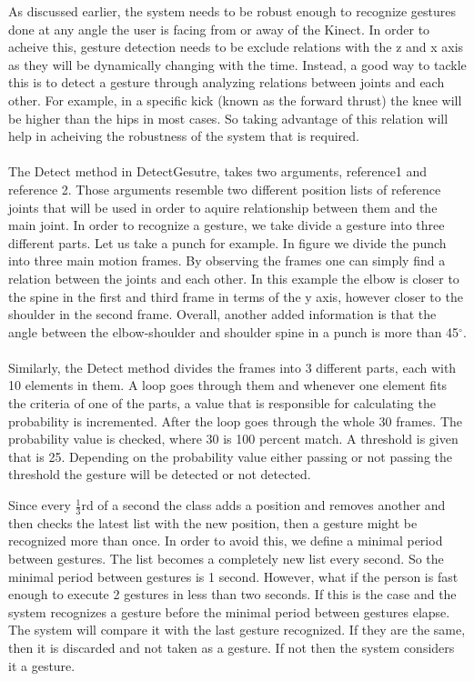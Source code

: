 

As discussed earlier, the system needs to be robust enough to recognize gestures done at any angle the user is facing from or away of the Kinect. In order to acheive this, gesture detection needs to be exclude relations with the z and x axis as they will be dynamically changing with the time. Instead, a good way to tackle this is to detect a gesture through analyzing relations between joints and each other. For example, in a specific kick (known as the forward thrust) the knee will be higher than the hips in most cases. So taking advantage of this relation will help in acheiving the robustness of the system that is required.
\\
\\
The Detect method in DetectGesutre, takes two arguments, reference1 and reference 2. Those arguments resemble two different position lists of reference joints that will be used in order to aquire relationship between them and the main joint. In order to recognize a gesture, we take divide a gesture into three different parts. Let us take a punch for example. In figure %
we divide the punch into three main motion frames. By observing the frames one can simply find a relation between the joints and each other. In this example the elbow is closer to the spine in the first and third frame in terms of the y axis, however closer to the shoulder in the second frame. Overall, another added information is that the angle between the elbow-shoulder and shoulder spine in a punch is more than 45$^\circ$. 
\\
\\
Similarly, the Detect method divides the frames into 3 different parts, each with 10 elements in them. A loop goes through them and whenever one element fits the criteria of one of the parts, a value that is responsible for calculating the probability is incremented. After the loop goes through the whole 30 frames. The probability value is checked, where 30 is 100 percent match. A threshold is given that is 25. Depending on the probability value either passing or not passing the threshold the gesture will be detected or not detected.



Since every $\frac{1}{3}$rd of a second the class adds a position and removes another and then checks the latest list with the new position, then a gesture might be recognized more than once. In order to avoid this, we define a minimal period between gestures. The list becomes a completely new list every second. So the minimal period between gestures is 1 second. However, what if the person is fast enough to execute 2 gestures in less than two seconds. If this is the case and the system recognizes a gesture before the minimal period between gestures elapse. The system will compare it with the last gesture recognized. If they are the same, then it is discarded and not taken as a gesture. If not then the system considers it a gesture.

